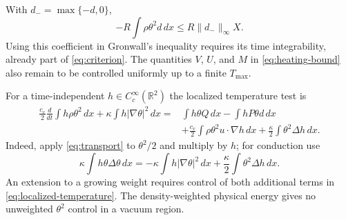 \documentclass[10pt,twoside]{article}
\newcommand{\R}{\mathbb R}
\newcommand{\dd}{\,dx}
\newcommand{\norm}[2]{\lVert#1\rVert_{#2}}
\begin{document}
With $d_-=\max\{-d,0\}$,
\begin{equation}\label{eq:compression}
 -R\int\rho\theta^2d\dd\le R\norm{d_-}{\infty} X.
\end{equation}
Using this coefficient in Gronwall's inequality requires its time
integrability, already part of \eqref{eq:criterion}.
The quantities $V$, $U$, and $M$ in \eqref{eq:heating-bound} also remain
to be controlled uniformly up to a finite $T_{\max}$.

For a time-independent $h\in C_c^\infty(\R^2)$ the localized
temperature test is
\begin{align}
 \frac{c_v}{2}\frac d{dt}\int h\rho\theta^2\dd
       +\kappa\int h|\nabla\theta|^2\dd
 ={}&\int h\theta Q\dd-\int hP\theta d\dd\nonumber\\
 &+\frac{c_v}{2}\int\rho\theta^2u\cdot\nabla h\dd
       +\frac{\kappa}{2}\int\theta^2\Delta h\dd.
       \label{eq:localized-temperature}
\end{align}
Indeed, apply \eqref{eq:transport} to $\theta^2/2$ and multiply by $h$;
for conduction use
\[
 \kappa\int h\theta\Delta\theta\dd
 =-\kappa\int h|\nabla\theta|^2\dd
       +\frac{\kappa}{2}\int\theta^2\Delta h\dd.
\]
An extension to a growing weight requires control of both additional
terms in \eqref{eq:localized-temperature}.
The density-weighted physical energy gives no unweighted $\theta^2$
control in a vacuum region.
\end{document}
